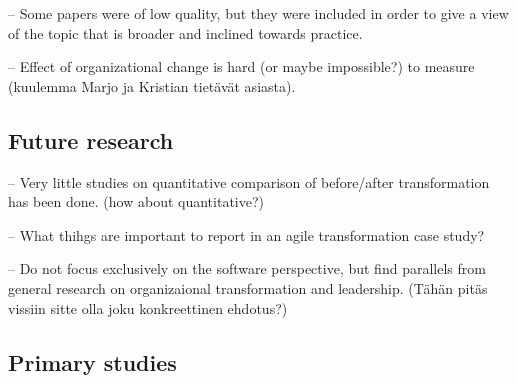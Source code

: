\documentclass[lnbip]{svmultln}
\begin{document}
-- Some papers were of low quality, but they were included in order to give a
view of the topic that is broader and inclined towards practice.

-- Effect of organizational change is hard (or maybe impossible?) to measure
(kuulemma Marjo ja Kristian tietävät asiasta).

\subsection{Future research}

-- Very little studies on quantitative comparison of before/after transformation
has been done. (how about quantitative?)

-- What thihgs are important to report in an agile transformation case study?

-- Do not focus exclusively on the software perspective, but find parallels from
general research on organizaional transformation and leadership. (Tähän pitäs
vissiin sitte olla joku konkreettinen ehdotus?)







\subsection*{Primary studies}
\end{document}
